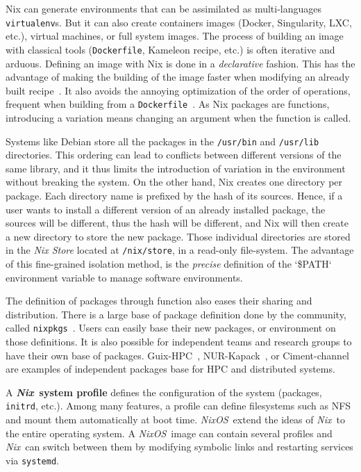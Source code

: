 \documentclass[sigconf]{acmart}
\newcommand{\nix}{\emph{Nix}}
\newcommand{\nixos}{\emph{NixOS}}
\begin{document}
Nix can generate environments that can be assimilated as multi-languages \texttt{virtualenv}s.
But it can also create containers images (Docker, Singularity, LXC, etc.), virtual machines, or full system images.
The process of building an image with classical tools (\texttt{Dockerfile}, Kameleon recipe, etc.) is often iterative and arduous.
Defining an image with Nix is done in a \emph{declarative} fashion.
This has the advantage of making the building of the image faster when modifying an already built recipe\ \cite{nxc}.
It also avoids the annoying optimization of the order of operations, frequent when building from a \texttt{Dockerfile}\ \cite{docker_cache}. 
As Nix packages are functions, introducing a variation means changing an argument when the function is called.

Systems like Debian store all the packages in the \texttt{/usr/bin} and \texttt{/usr/lib} directories.
This ordering can lead to conflicts between different versions of the same library, and it thus limits the introduction of variation in the environment without breaking the system.
On the other hand, Nix creates one directory per package.
Each directory name is prefixed by the hash of its sources.
Hence, if a user wants to install a different version of an already installed package, the sources will be different, thus the hash will be different, and Nix will then create a new directory to store the new package.
Those individual directories are stored in the \emph{Nix Store} located at \texttt{/nix/store}, in a read-only file-system.
The advantage of this fine-grained isolation method, is the \emph{precise} definition of the `\$PATH` environment variable to manage software environments.

The definition of packages through function also eases their sharing and distribution.
There is a large base of package definition done by the community, called \texttt{nixpkgs}\ \cite{nixpkgs}.
Users can easily base their new packages, or environment on those definitions.
It is also possible for independent teams and research groups to have their own base of packages.
Guix-HPC\ \cite{guix-hpc}, NUR-Kapack\ \cite{kapack}, or Ciment-channel\ \cite{ciment_channel} are examples of independent packages base for HPC and distributed systems.

A \textbf{\nix\ system profile} defines the configuration of the system (packages, \texttt{initrd}, etc.).
Among many features, a profile can define filesystems such as NFS and mount them automatically at boot time.
\nixos\ extend the ideas of \nix\ to the entire operating system.
A \nixos\ image can contain several profiles and \nix\ can switch between them by modifying symbolic links and restarting services via \texttt{systemd}.
\end{document}
